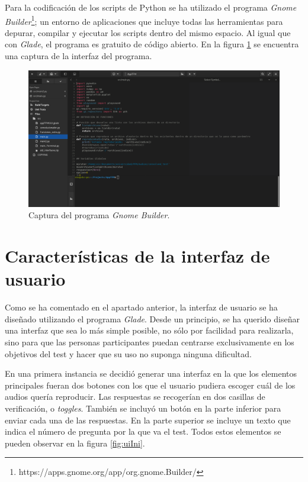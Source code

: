 \documentclass[11pt,a4paper,twoside]{book}
\begin{document}
           \newpage

           Para la codificación de los scripts de Python se ha utilizado el programa \textit{Gnome Builder}\footnote{https://apps.gnome.org/app/org.gnome.Builder/}; un entorno de aplicaciones que incluye todas las herramientas para depurar, compilar y ejecutar los scripts dentro del mismo espacio. Al igual que con \textit{Glade}, el programa es gratuito de código abierto. En la figura \ref{fig:builderIni} se encuentra una captura de la interfaz del programa.
           
            \begin{figure}[H]
                \begin{center}
                    \includegraphics[scale=.2]{../imagenes/builderIni.png}
                    \caption{Captura del programa \textit{Gnome Builder}.}
                    \label{fig:builderIni}
                \end{center}
            \end{figure}
            
        \section{Características de la interfaz de usuario}
            Como se ha comentado en el apartado anterior, la interfaz de usuario se ha diseñado utilizando el programa \textit{Glade}. Desde un principio, se ha querido diseñar una interfaz que sea lo más simple posible, no sólo por facilidad para realizarla, sino para que las personas participantes puedan centrarse exclusivamente en los objetivos del test y hacer que su uso no suponga ninguna dificultad.  
            
            En una primera instancia se decidió generar una interfaz en la que los elementos principales fueran dos botones con los que el usuario pudiera escoger cuál de los audios quería reproducir. Las respuestas se recogerían en dos casillas de verificación, o \textit{toggles}. También se incluyó un botón en la parte inferior para enviar cada una de las respuestas. En la parte superior se incluye un texto que indica el número de pregunta por la que va el test. Todos estos elementos se pueden observar en la figura \ref{fig:uiIni}.
            
\end{document}
